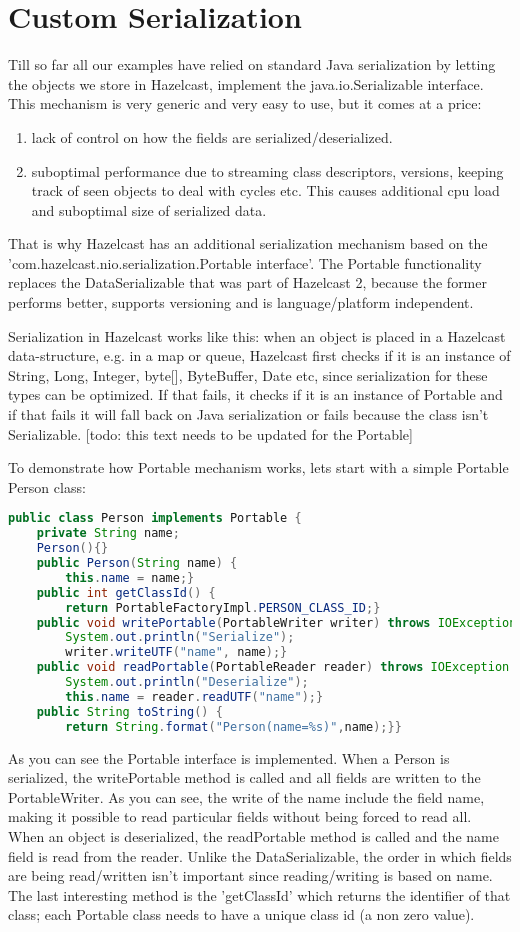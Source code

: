 \chapter{Custom Serialization}
Till so far all our examples have relied on standard Java serialization by letting the objects we store in Hazelcast, implement the java.io.Serializable interface. This mechanism is very generic and very easy to use, but it comes at a price:
\begin{enumerate}
\item lack of control on how the fields are serialized/deserialized.
\item suboptimal performance due to streaming class descriptors, versions, keeping track of seen objects to deal with cycles etc. This causes additional cpu load and suboptimal size of serialized data.
\end{enumerate}
That is why Hazelcast has an additional serialization mechanism based on the 'com.hazelcast.nio.serialization.Portable interface'. The Portable functionality replaces the DataSerializable that was part of Hazelcast 2, because the former performs better, supports versioning and is language/platform independent.

Serialization in Hazelcast works like this: when an object is placed in a Hazelcast data-structure, e.g. in a map or queue, Hazelcast first checks if it is an instance of String, Long, Integer, byte[], ByteBuffer, Date etc, since serialization for these types can be optimized. If that fails, it checks if it is an instance of Portable and if that fails it will fall back on Java serialization or fails because the class isn't Serializable. [todo: this text needs to be updated for the Portable]

To demonstrate how Portable mechanism works, lets start with a simple Portable Person class: 
\begin{lstlisting}[language=java]
public class Person implements Portable {
    private String name;
    Person(){}
    public Person(String name) {
        this.name = name;}
    public int getClassId() {
        return PortableFactoryImpl.PERSON_CLASS_ID;}
    public void writePortable(PortableWriter writer) throws IOException {
        System.out.println("Serialize");
        writer.writeUTF("name", name);}
    public void readPortable(PortableReader reader) throws IOException {
        System.out.println("Deserialize");
        this.name = reader.readUTF("name");}
    public String toString() {
        return String.format("Person(name=%s)",name);}}
\end{lstlisting}
As you can see the Portable interface is implemented. When a Person is serialized, the writePortable method is called and all fields are written to the PortableWriter. As you can see, the write of the name include the field name, making it possible to read particular fields without being forced to read all. When an object is deserialized, the readPortable method is called and the name field is read from the reader. Unlike the DataSerializable, the order in which fields are being read/written isn't important since reading/writing is based  on name. The last interesting method is the 'getClassId' which returns the identifier of that class; each Portable class needs to have a unique class id (a non zero value).

